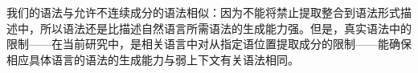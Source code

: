 
    我们的语法与允许不连续成分的语法相似：因为不能将禁止提取整合到语法形式描述中，所以语法还是比描述自然语言所需语法的生成能力强。但是，真实语法中的限制——在当前研究中，是相关语言中对从指定语位置提取成分的限制——能确保相应具体语言的语法的生成能力与弱上下文有关语法相同。



